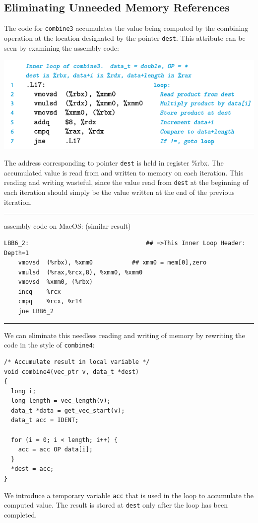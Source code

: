 \documentclass[11pt]{article}
\begin{document}
\subsection{Eliminating Unneeded Memory References}
\label{sec:org86b59e4}
The code for \texttt{combine3} accumulates the value being computed by the combining operation at the location designated by the pointer \texttt{dest}. This attribute can be seen by examining the assembly code:\\

\begin{center}
\includegraphics[width=.9\linewidth]{pics/combine3-assembly-code.png}
\end{center}

The address corresponding to pointer \texttt{dest} is held in register \%rbx. The accumulated value is read from and written to memory on each iteration. This reading and writing wasteful, since the value read from \texttt{dest} at the beginning of each iteration should simply be the value written at the end of the previous iteration.\\

\noindent\rule{\textwidth}{0.5pt}
assembly code on MacOS: (similar result)\\
\begin{verbatim}
LBB6_2:                                 ## =>This Inner Loop Header: Depth=1
	vmovsd	(%rbx), %xmm0           ## xmm0 = mem[0],zero
	vmulsd	(%rax,%rcx,8), %xmm0, %xmm0
	vmovsd	%xmm0, (%rbx)
	incq	%rcx
	cmpq	%rcx, %r14
	jne	LBB6_2

\end{verbatim}

\noindent\rule{\textwidth}{0.5pt}

We can eliminate this needless reading and writing of memory by rewriting the code in the style of \texttt{combine4}:\\
\begin{verbatim}
/* Accumulate result in local variable */
void combine4(vec_ptr v, data_t *dest)
{
  long i;
  long length = vec_length(v);
  data_t *data = get_vec_start(v);
  data_t acc = IDENT;

  for (i = 0; i < length; i++) {
    acc = acc OP data[i];
  }
  *dest = acc;
}

\end{verbatim}
We introduce a temporary variable \texttt{acc} that is used in the loop to accumulate the computed value. The result is stored at \texttt{dest} only after the loop has been completed.\\
\end{document}
